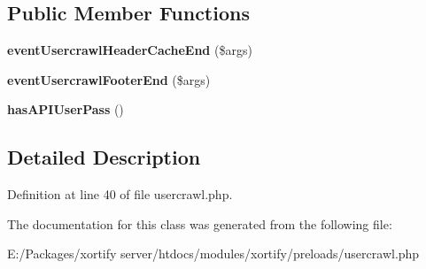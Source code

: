 \subsection*{Public Member Functions}
\begin{DoxyCompactItemize}
\item 
\hypertarget{class_xortify_usercrawl_preload_ac2af80e68afcdf13313a117ae01a9a6c}{{\bfseries event\-Usercrawl\-Header\-Cache\-End} (\$args)}\label{class_xortify_usercrawl_preload_ac2af80e68afcdf13313a117ae01a9a6c}

\item 
\hypertarget{class_xortify_usercrawl_preload_ad0df3ce79d7b6da3335c3fe84d777ce7}{{\bfseries event\-Usercrawl\-Footer\-End} (\$args)}\label{class_xortify_usercrawl_preload_ad0df3ce79d7b6da3335c3fe84d777ce7}

\item 
\hypertarget{class_xortify_usercrawl_preload_a2ed534bf0ce75f3f5ea332fa6b373549}{{\bfseries has\-A\-P\-I\-User\-Pass} ()}\label{class_xortify_usercrawl_preload_a2ed534bf0ce75f3f5ea332fa6b373549}

\end{DoxyCompactItemize}


\subsection{Detailed Description}


Definition at line 40 of file usercrawl.\-php.



The documentation for this class was generated from the following file\-:\begin{DoxyCompactItemize}
\item 
E\-:/\-Packages/xortify server/htdocs/modules/xortify/preloads/usercrawl.\-php\end{DoxyCompactItemize}
